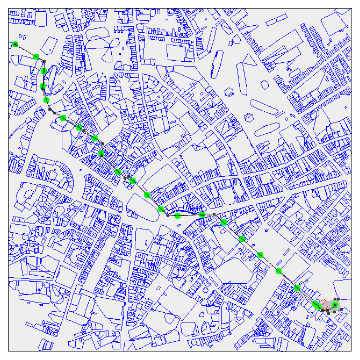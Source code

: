 \documentclass[12pt]{article}
\begin{document}
\begin{figure}[h]
    \centering


    \begin{subfigure}[b]{0.6\textwidth}
        \includegraphics[width=\textwidth]{img/leuven}
    \end{subfigure}
        ~ %
        \begin{subfigure}[b]{0.35\textwidth}

\end{subfigure}
\end{figure}
\end{document}

